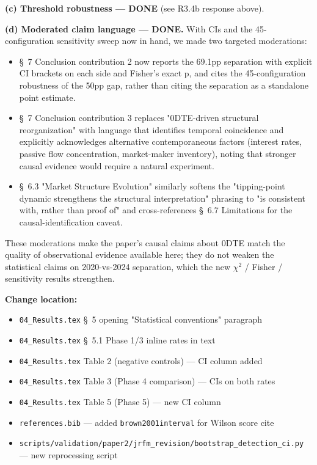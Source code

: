 \documentclass[11pt,a4paper]{article}
\begin{document}
\textbf{(c) Threshold robustness --- DONE} (see R3.4b response above).

\textbf{(d) Moderated claim language --- DONE.} With CIs and the 45-configuration
sensitivity sweep now in hand, we made two targeted moderations:

\begin{itemize}
\item \S{}~7 Conclusion contribution 2 now reports the 69.1pp separation with explicit CI brackets on each side and Fisher's exact p, and cites the 45-configuration robustness of the 50pp gap, rather than citing the separation as a standalone point estimate.
\item \S{}~7 Conclusion contribution 3 replaces "0DTE-driven structural reorganization" with language that identifies temporal coincidence and explicitly acknowledges alternative contemporaneous factors (interest rates, passive flow concentration, market-maker inventory), noting that stronger causal evidence would require a natural experiment.
\item \S{}~6.3 "Market Structure Evolution" similarly softens the "tipping-point dynamic strengthens the structural interpretation" phrasing to "is consistent with, rather than proof of" and cross-references \S{}~6.7 Limitations for the causal-identification caveat.
\end{itemize}

These moderations make the paper's causal claims about 0DTE match the
quality of observational evidence available here; they do not weaken
the statistical claims on 2020-vs-2024 separation, which the new
$\chi$$^{2}$ / Fisher / sensitivity results strengthen.

\textbf{Change location:}

\begin{itemize}
\item \texttt{04\_Results.tex} \S{}~5 opening "Statistical conventions" paragraph
\item \texttt{04\_Results.tex} \S{}~5.1 Phase 1/3 inline rates in text
\item \texttt{04\_Results.tex} Table 2 (negative controls) --- CI column added
\item \texttt{04\_Results.tex} Table 3 (Phase 4 comparison) --- CIs on both rates
\item \texttt{04\_Results.tex} Table 5 (Phase 5) --- new CI column
\item \texttt{references.bib} --- added \texttt{brown2001interval} for Wilson score cite
\item \texttt{scripts/validation/paper2/jrfm\_revision/bootstrap\_detection\_ci.py} --- new reprocessing script
\end{itemize}
\end{document}
